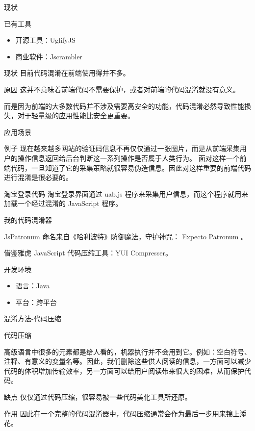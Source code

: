 \documentclass[presentation]{beamer}
\begin{document}
\begin{frame}[label=sec-4]{现状}
\begin{block}{已有工具}
\begin{itemize}
\item 开源工具：UglifyJS
\item 商业软件：Jscrambler
\end{itemize}
\end{block}
\begin{block}{现状}
目前代码混淆在前端使用得并不多。
\begin{block}{原因}
这并不意味着前端代码不需要保护，或者对前端的代码混淆就没有意义。

而是因为前端的大多数代码并不涉及需要高安全的功能，代码混淆必然导致性能损失，对于轻量级的应用性能比安全更重要。
\end{block}
\end{block}
\end{frame}
\begin{frame}[label=sec-5]{应用场景}
\begin{block}{例子}
现在越来越多网站的验证码信息不再仅仅通过一张图片，而是从前端采集用户的操作信息返回给后台判断这一系列操作是否属于人类行为。
面对这样一个前端代码，一旦知道了它的采集策略就很容易伪造信息。因此对这样重要的前端代码进行混淆是很必要的。
\end{block}
\begin{block}{淘宝登录代码}
淘宝登录界面通过 uab.js 程序来采集用户信息，而这个程序就用来加载一个经过混淆的 JavaScript 程序。
\end{block}
\end{frame}
\begin{frame}[label=sec-6]{我的代码混淆器}
\begin{block}{JsPatronum}
命名来自《哈利波特》防御魔法，守护神咒： Expecto Patronum 。

借鉴雅虎 JavaScript 代码压缩工具：YUI Compresser。
\end{block}
\begin{block}{开发环境}
\begin{itemize}
\item 语言：Java
\item 平台：跨平台
\end{itemize}
\end{block}
\end{frame}
\begin{frame}[label=sec-7]{混淆方法-代码压缩}
\begin{block}{代码压缩}

高级语言中很多的元素都是给人看的，机器执行并不会用到它。例如：空白符号、注释、有意义的变量名等。因此，我们删除这些供人阅读的信息，一方面可以减少代码的体积增加传输效率，另一方面可以给用户阅读带来很大的困难，从而保护代码。
\end{block}
\begin{block}{缺点}
仅仅通过代码压缩，很容易被一些代码美化工具所还原。
\end{block}
\begin{block}{作用}
因此在一个完整的代码混淆器中，代码压缩通常会作为最后一步用来锦上添花。
\end{block}
\end{frame}
\end{document}
